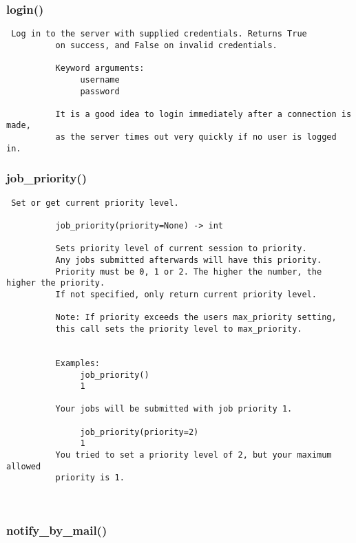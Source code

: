 \subsubsection{login()}


\begin{verbatim}
 Log in to the server with supplied credentials. Returns True
          on success, and False on invalid credentials.
          
          Keyword arguments:
               username
               password
          
          It is a good idea to login immediately after a connection is made,
          as the server times out very quickly if no user is logged in.
\end{verbatim}
\subsubsection{job\_priority()}


\begin{verbatim}
 Set or get current priority level.
          
          job_priority(priority=None) -> int

          Sets priority level of current session to priority.
          Any jobs submitted afterwards will have this priority.
          Priority must be 0, 1 or 2. The higher the number, the higher the priority.
          If not specified, only return current priority level.

          Note: If priority exceeds the users max_priority setting,
          this call sets the priority level to max_priority.
          
          
          Examples:
               job_priority()
               1

          Your jobs will be submitted with job priority 1.

               job_priority(priority=2)
               1
          You tried to set a priority level of 2, but your maximum allowed
          priority is 1. 
          
          
\end{verbatim}
\subsubsection{notify\_by\_mail()}


